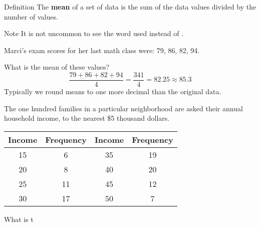 \documentclass{beamer}
\begin{document}
\begin{frame}
\begin{example}
{
}
\vspace{-5mm}
\end{example}
\end{frame}

\begin{frame}
\begin{block}{Definition}
The \textbf{mean} of a set of data is the sum of the data values divided by the number of values.
\end{block}\pause

\begin{block}{Note}
It is not uncommon to see the word  used instead of .
\end{block}\pause

\begin{example}
Marci's exam scores for her last math class were: 79, 86, 82, 94. 

What is the mean of these values?\pause
\begin{equation*}
\dfrac{79+86+82+94}{4}=\dfrac{341}{4}=82.25\approx 85.3
\end{equation*}
Typically we round means to one more decimal than the original data.
\end{example}\pause
\end{frame}

\begin{frame}
\begin{example}
The one hundred families in a particular neighborhood are asked their annual household income, to the nearest \$5 thousand dollars. 
\begin{center}
\begin{tabular}{|c|c||c|c|}
\hline
Income & Frequency & Income & Frequency \\\hline
15 &6 & 35 &19\\\hline
20 &8 & 40 &20\\\hline
25 &11 & 45 &12\\\hline
30 &17 & 50 &7\\\hline
\end{tabular}
\end{center}
What is t
\end{example}
\end{frame}
\end{document}
